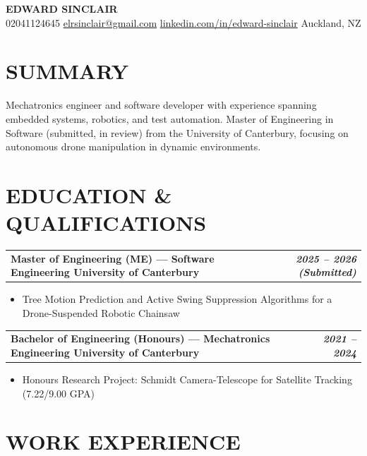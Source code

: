 \documentclass[11pt, a4paper]{article}
\makeatletter
\newcommand{\cventry}[2]{%
  \vspace{2pt}%
  \noindent
  \begin{tabularx}{\linewidth}{@{}X r@{}}
    \textbf{#1} & \textbf{\textit{#2}}
  \end{tabularx}%
  \vspace{1pt}%
}
\makeatother
\begin{document}
\begin{center}
  {\LARGE\bfseries\color{accent} EDWARD SINCLAIR}\\[4pt]
  \small
  02041124645
  \textbar{}
  \href{mailto:elrsinclair@gmail.com}{elrsinclair@gmail.com}
  \textbar{}
  \href{https://www.linkedin.com/in/edward-sinclair/}{linkedin.com/in/edward-sinclair}
  \textbar{}
  Auckland, NZ
\end{center}

\section{SUMMARY}

Mechatronics engineer and software developer with experience spanning embedded systems,
robotics, and test automation. Master of Engineering in Software (submitted, in review)
from the University of Canterbury, focusing on autonomous drone manipulation in dynamic
environments.

\section{EDUCATION \& QUALIFICATIONS}

\cventry{Master of Engineering (ME) — Software Engineering
         \textbar{} University of Canterbury}{2025 – 2026 (Submitted)}
\begin{itemize}
  \item Tree Motion Prediction and Active Swing Suppression Algorithms for a
        Drone-Suspended Robotic Chainsaw
\end{itemize}

\cventry{Bachelor of Engineering (Honours) — Mechatronics Engineering
         \textbar{} University of Canterbury}{2021 – 2024}
\begin{itemize}
  \item Honours Research Project: Schmidt Camera-Telescope for Satellite Tracking
        (7.22/9.00 GPA)
\end{itemize}

\section{WORK EXPERIENCE}
\end{document}
